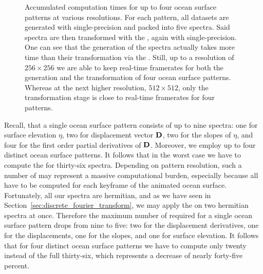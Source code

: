 \begin{figure}
\caption{Accumulated computation times for up to four ocean surface patterns at
various resolutions. For each pattern, all datasets are generated with
single-precision and packed into five spectra. Said spectra are then
transformed with the \IDFT, again with single-precision. One can see that the
generation of the spectra actually takes more time than their transformation
via the \IDFT. Still, up to a resolution of $256 \times 256$ we are
able to keep real-time framerates for both the generation and the transformation
of four ocean surface patterns. Whereas at the next higher resolution,
$512 \times 512$, only the transformation stage is close to real-time
framerates for four patterns.
}
\label{fig:gen:idft}
\end{figure}
%
Recall, that a single ocean surface pattern consists of up to nine spectra:
one for surface elevation $\eta$, two for displacement vector $\mathbf{D}$,
two for the slopes of $\eta$, and four for the first order partial derivatives
of $\mathbf{D}$.
Moreover, we employ up to four distinct ocean surface patterns.
It follows that in the worst case we have to compute the
\InvDiscreteFourierTransform for thirty-six spectra. Depending on pattern
resolution, such a number of \IDFTs may represent a massive computational
burden, especially because all \IDFTs have to be computed for each keyframe
of the animated ocean surface.
Fortunately, all our spectra are hermitian, and as we have seen in
Section~\ref{sec:discrete_fourier_transform}, we may apply the
\InvDiscreteFourierTransform on two hermitian spectra at once.
Therefore the maximum number of required \IDFTs for a single ocean surface
pattern drops from nine to five: two for the displacement derivatives,
one for the displacements, one for the slopes, and one for surface elevation.
It follows that for four distinct ocean surface patterns we have to compute
only twenty \IDFTs instead of the full thirty-six, which represents a decrease
of nearly forty-five percent.


